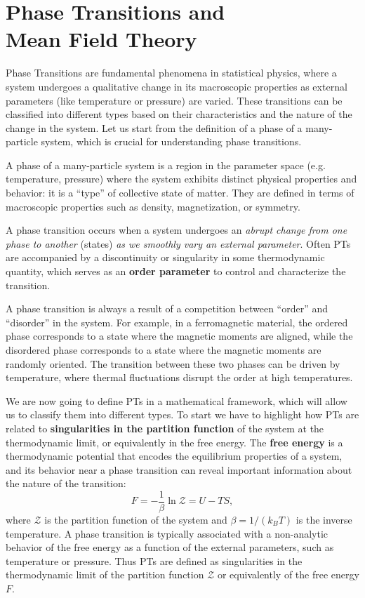 \chapter[Phase Transitions and Mean Field Theory]{Phase Transitions and \\Mean Field Theory}

Phase Transitions are fundamental phenomena in statistical physics, where a system undergoes a qualitative change in its macroscopic properties as external parameters (like temperature or pressure) are varied. These transitions can be classified into different types based on their characteristics and the nature of the change in the system. Let us start from the definition of a phase of a many-particle system, which is crucial for understanding phase transitions.

\begin{definition}
    A phase of a many-particle system is a region in the parameter space (e.g. temperature, pressure) where the system exhibits distinct physical properties and behavior: it is a ``type'' of collective state of matter. They are defined in terms of macroscopic properties such as density, magnetization, or symmetry.
\end{definition}

A phase transition occurs when a system undergoes an \textit{abrupt change from one phase to another} (states) \textit{as we smoothly vary an external parameter}. Often PTs are accompanied by a discontinuity or singularity in some thermodynamic quantity, which serves as an \textbf{order parameter} to control and characterize the transition.

A phase transition is always a result of a competition between ``order'' and ``disorder'' in the system. For example, in a ferromagnetic material, the ordered phase corresponds to a state where the magnetic moments are aligned, while the disordered phase corresponds to a state where the magnetic moments are randomly oriented. The transition between these two phases can be driven by temperature, where thermal fluctuations disrupt the order at high temperatures.

We are now going to define PTs in a mathematical framework, which will allow us to classify them into different types. To start we have to highlight how PTs are related to \textbf{singularities in the partition function} of the system at the thermodynamic limit, or equivalently in the free energy. The \textbf{free energy} is a thermodynamic potential that encodes the equilibrium properties of a system, and its behavior near a phase transition can reveal important information about the nature of the transition:
\[
    F = -\frac{1}{\beta} \ln \mathcal{Z} = U - TS,
\]
where $\mathcal{Z}$ is the partition function of the system and $\beta = 1/(k_B T)$ is the inverse temperature. A phase transition is typically associated with a non-analytic behavior of the free energy as a function of the external parameters, such as temperature or pressure. Thus PTs are defined as singularities in the thermodynamic limit of the partition function $\mathcal{Z}$ or equivalently of the free energy $F$.

